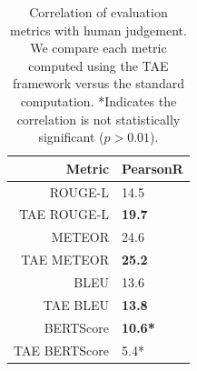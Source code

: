 \begin{table}
\centering
\small
\begin{tabular}{r|l}
Metric & PearsonR \\ \hline
ROUGE-L & 14.5 \\ 
TAE ROUGE-L & \textbf{19.7} \\
\hdashline[0.5pt/3pt]
METEOR & 24.6 \\ 
TAE METEOR & \textbf{25.2} \\
\hdashline[0.5pt/3pt]
BLEU & 13.6 \\ 
TAE BLEU & \textbf{13.8} \\
\hdashline[0.5pt/3pt]
BERTScore & \textbf{10.6*} \\
TAE BERTScore & 5.4* \\ 
\end{tabular}
\caption{Correlation of evaluation metrics with human judgement. We compare each metric computed using the TAE framework versus the standard computation. *Indicates the correlation is not statistically significant ($p>0.01$).}
\label{tbl:correlation}
\end{table}
